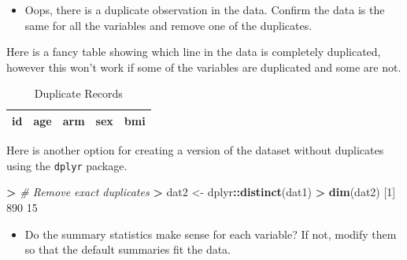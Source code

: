 \documentclass[
]{book}
\newenvironment{Shaded}{\begin{snugshade}}{\end{snugshade}}
\newcommand{\CommentTok}[1]{\textcolor[rgb]{0.56,0.35,0.01}{\textit{#1}}}
\newcommand{\DataTypeTok}[1]{\textcolor[rgb]{0.13,0.29,0.53}{#1}}
\newcommand{\DecValTok}[1]{\textcolor[rgb]{0.00,0.00,0.81}{#1}}
\newcommand{\ErrorTok}[1]{\textcolor[rgb]{0.64,0.00,0.00}{\textbf{#1}}}
\newcommand{\KeywordTok}[1]{\textcolor[rgb]{0.13,0.29,0.53}{\textbf{#1}}}
\newcommand{\NormalTok}[1]{#1}
\newcommand{\OperatorTok}[1]{\textcolor[rgb]{0.81,0.36,0.00}{\textbf{#1}}}
\newcommand{\StringTok}[1]{\textcolor[rgb]{0.31,0.60,0.02}{#1}}
\providecommand{\tightlist}{%
  \setlength{\itemsep}{0pt}\setlength{\parskip}{0pt}}
\begin{document}
\begin{itemize}
\tightlist
\item
  Oops, there is a duplicate observation in the data. Confirm the data is the same for all the variables and remove one of the duplicates.
\end{itemize}

Here is a fancy table showing which line in the data is completely duplicated, however this won't work if some of the variables are duplicated and some are not.

\begin{Shaded}
\end{Shaded}

\begin{table}

\caption{\label{tab:unnamed-chunk-45}Duplicate Records}
\centering
\begin{tabular}[t]{r|r|l|l|r}
\hline
id & age & arm & sex & bmi\\


\hline
\end{tabular}
\end{table}

Here is another option for creating a version of the dataset without duplicates using the \texttt{dplyr} package.

\begin{Shaded}
\begin{Highlighting}[]
\OperatorTok{>}\StringTok{ }\CommentTok{# Remove exact duplicates}
\ErrorTok{>}\StringTok{ }\NormalTok{dat2 <-}\StringTok{ }\NormalTok{dplyr}\OperatorTok{::}\KeywordTok{distinct}\NormalTok{(dat1)}
\OperatorTok{>}\StringTok{ }\KeywordTok{dim}\NormalTok{(dat2)}
\NormalTok{[}\DecValTok{1}\NormalTok{] }\DecValTok{890}  \DecValTok{15}
\end{Highlighting}
\end{Shaded}

\begin{itemize}
\tightlist
\item
  Do the summary statistics make sense for each variable? If not, modify them so that the default summaries fit the data.
\end{itemize}
\end{document}
